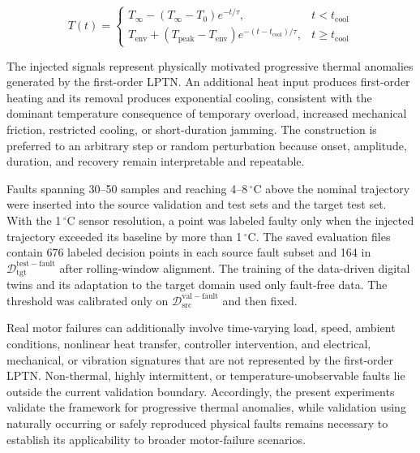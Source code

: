 \documentclass[a4paper,10pt]{cas-sc}%
\newcommand{\rev}[1]{#1}
\newcommand{\roundtworev}[1]{\textcolor{roundtwored}{#1}}
\newenvironment{revision}{}{}
\begin{document}
\begin{equation}
	T(t) =
	\begin{cases}
		T_{\infty} - (T_{\infty} - T_0) e^{-t/\tau},                                                 & t < t_{\mathrm{cool}}    \\[6pt]
		T_{\mathrm{env}} + (T_{\mathrm{peak}} - T_{\mathrm{env}}) e^{-(t - t_{\mathrm{cool}})/\tau}, & t \geq t_{\mathrm{cool}}
	\end{cases}
	\label{eq:combined}
\end{equation}

\begin{revision}
	The injected signals represent physically motivated progressive thermal anomalies generated by the first-order LPTN. An additional heat input produces first-order heating and its removal produces exponential cooling, consistent with the dominant temperature consequence of temporary overload, increased mechanical friction, restricted cooling, or short-duration jamming. The construction is preferred to an arbitrary step or random perturbation because onset, amplitude, duration, and recovery remain interpretable and repeatable.

	\rev{Faults spanning 30--50 samples and reaching 4--8\,$^\circ$C above the nominal trajectory were inserted into the source validation and test sets and the target test set. With the 1\,$^\circ$C sensor resolution, a point was labeled faulty only when the injected trajectory exceeded its baseline by more than 1\,$^\circ$C. The saved evaluation files contain 676 labeled decision points in each source fault subset and 164 in $\mathcal{D}_{\mathrm{tgt}}^{\mathrm{test-fault}}$ after rolling-window alignment. The training of the data-driven digital twins and its adaptation to the target domain used only fault-free data. The threshold was calibrated only on $\mathcal{D}_{\mathrm{src}}^{\mathrm{val-fault}}$ and then fixed.}

	\roundtworev{Real motor failures can additionally involve time-varying load, speed, ambient conditions, nonlinear heat transfer, controller intervention, and electrical, mechanical, or vibration signatures that are not represented by the first-order LPTN. Non-thermal, highly intermittent, or temperature-unobservable faults lie outside the current validation boundary. Accordingly, the present experiments validate the framework for progressive thermal anomalies, while validation using naturally occurring or safely reproduced physical faults remains necessary to establish its applicability to broader motor-failure scenarios.}
\end{revision}
\end{document}
